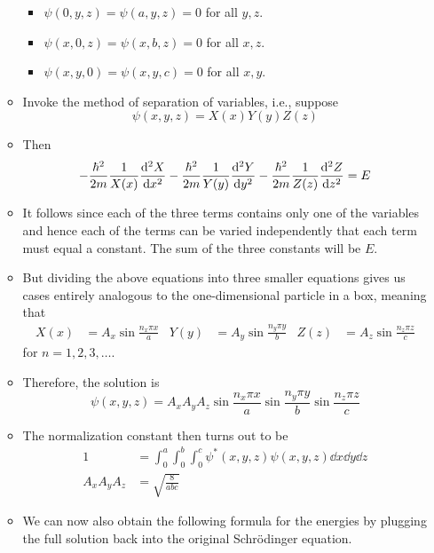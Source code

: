 \documentclass[../notes.tex]{subfiles}
\begin{document}
\begin{itemize}
\begin{itemize}
        \begin{itemize}
            \item $\psi(0,y,z)=\psi(a,y,z)=0$ for all $y,z$.
            \item $\psi(x,0,z)=\psi(x,b,z)=0$ for all $x,z$.
            \item $\psi(x,y,0)=\psi(x,y,c)=0$ for all $x,y$.
        \end{itemize}
        \item Invoke the method of separation of variables, i.e., suppose
        \begin{equation*}
            \psi(x,y,z) = X(x)Y(y)Z(z)
        \end{equation*}
        \item Then
        \begin{equation*}
            -\frac{\hbar^2}{2m}\frac{1}{X(x)}\dv[2]{X}{x}-\frac{\hbar^2}{2m}\frac{1}{Y(y)}\dv[2]{Y}{y}-\frac{\hbar^2}{2m}\frac{1}{Z(z)}\dv[2]{Z}{z} = E
        \end{equation*}
        \item It follows since each of the three terms contains only one of the variables and hence each of the terms can be varied independently that each term must equal a constant. The sum of the three constants will be $E$.
        \item But dividing the above equations into three smaller equations gives us cases entirely analogous to the one-dimensional particle in a box, meaning that
        \begin{align*}
            X(x) &= A_x\sin\frac{n_x\pi x}{a}&
            Y(y) &= A_y\sin\frac{n_y\pi y}{b}&
            Z(z) &= A_z\sin\frac{n_z\pi z}{c}
        \end{align*}
        for $n=1,2,3,\dots$.
        \item Therefore, the solution is
        \begin{equation*}
            \psi(x,y,z) = A_xA_yA_z\sin\frac{n_x\pi x}{a}\sin\frac{n_y\pi y}{b}\sin\frac{n_z\pi z}{c}
        \end{equation*}
        \item The normalization constant then turns out to be
        \begin{align*}
            1 &= \int_0^a\int_0^b\int_0^c\psi^*(x,y,z)\psi(x,y,z)\dd{x}\dd{y}\dd{z}\\
            A_xA_yA_z &= \sqrt{\frac{8}{abc}}
        \end{align*}
        \item We can now also obtain the following formula for the energies by plugging the full solution back into the original Schr\"{o}dinger equation.

\end{itemize}
\end{itemize}
\end{document}
